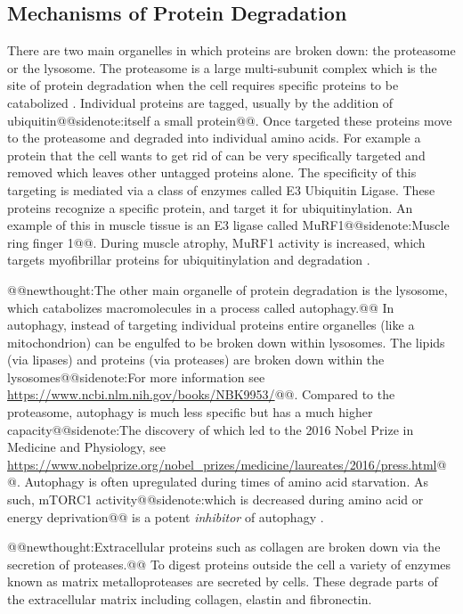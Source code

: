 \documentclass{tufte-handout}
\makeatletter
\def\newthought#1{@@newthought:#1@@}
\def\sidenote#1{@@sidenote:#1@@}
\makeatother
\begin{document}
\subsection{Mechanisms of Protein Degradation}

There are two main organelles in which proteins are broken down: the proteasome or the lysosome.  The proteasome is a large multi-subunit complex which is the site of protein degradation when the cell requires specific proteins to be catabolized \citep{Finley2009}.  Individual proteins are tagged, usually by the addition of ubiquitin\sidenote{itself a small protein}. Once targeted these proteins move to the proteasome and degraded into individual amino acids.  For example a protein that the cell wants to get rid of can be very specifically targeted and removed which leaves other untagged proteins alone. The specificity of this targeting is mediated via a class of enzymes called E3 Ubiquitin Ligase.  These proteins recognize a specific protein, and target it for ubiquitinylation. An example of this in muscle tissue is an E3 ligase called MuRF1\sidenote{Muscle ring finger 1}.  During muscle atrophy, MuRF1 activity is increased, which targets myofibrillar proteins for ubiquitinylation and degradation \citep{Bodine2014}.  

\newthought{The other main organelle of protein degradation is the lysosome, which catabolizes macromolecules in a process called autophagy.}  In autophagy, instead of targeting individual proteins entire organelles (like a mitochondrion) can be engulfed to be broken down within lysosomes.  The lipids (via lipases) and proteins (via proteases) are broken down within the lysosomes\sidenote{For more information see \url{https://www.ncbi.nlm.nih.gov/books/NBK9953/}}.  Compared to the proteasome, autophagy is much less specific but has a much higher capacity\sidenote{The discovery of which led to the 2016 Nobel Prize in Medicine and Physiology, see \url{https://www.nobelprize.org/nobel_prizes/medicine/laureates/2016/press.html}}.  Autophagy is often upregulated during times of amino acid starvation.  As such, mTORC1 activity\sidenote{which is decreased during amino acid or energy deprivation} is a potent \emph{inhibitor} of autophagy \citep{Noda1998}.

\newthought{Extracellular proteins such as collagen are broken down via the secretion of proteases.}  To digest proteins outside the cell a variety of enzymes known as matrix metalloproteases are secreted by cells.  These degrade parts of the extracellular matrix including collagen, elastin and fibronectin.
\end{document}
